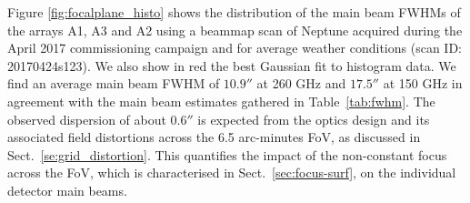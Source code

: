 Figure \ref{fig:focalplane_histo} shows the distribution of the
main beam FWHMs of the arrays A1, A3 and A2 using a beammap
scan of Neptune acquired during the April 2017 commissioning
campaign and for average weather conditions (scan ID: 20170424s123). We also
show in red the best Gaussian fit to histogram data. We find an
average main beam FWHM of $10.9''$ at 260 GHz and $17.5''$ at
150 GHz in agreement with the main beam estimates gathered in
Table~\ref{tab:fwhm}.
The observed dispersion of about $0.6''$ is expected from the optics design and its associated
field distortions across the 6.5 arc-minutes FoV, as discussed in
Sect.~\ref{se:grid_distortion}. This quantifies the impact of the
non-constant focus across the FoV, which is characterised in
Sect.~\ref{sec:focus-surf}, on the individual detector main beams.  





